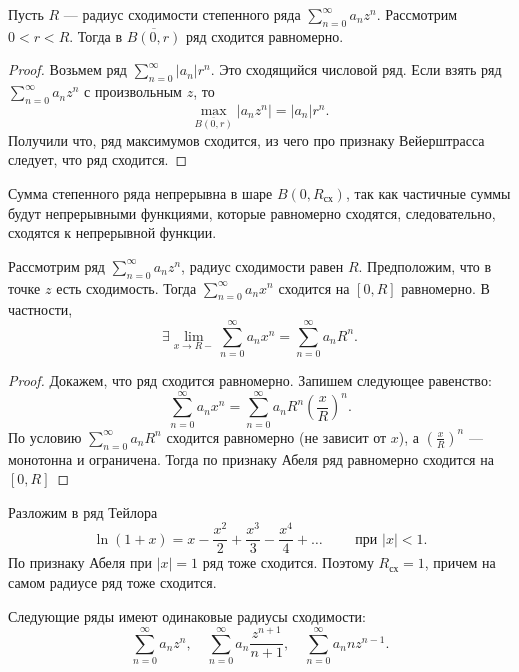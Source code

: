\begin{thm}
	Пусть $ R$ --- радиус сходимости степенного ряда  $ \sum_{n=0}^{\infty} a_n z^{n}$. Рассмотрим $ 0 < r < R$. Тогда в $ \overline{B(0, r)}$ ряд сходится равномерно.
\end{thm}
\begin{proof}
    Возьмем ряд $ \sum_{n=0}^{\infty} \lvert a_n \rvert r^{n}$. Это сходящийся числовой ряд. Если взять ряд $ \sum_{n=0}^{\infty} a_n z^{n}$ с произвольным $ z$, то 
	\[
		\max_{\overline{B(0, r)}} \lvert a_n z^{n} \rvert = \lvert a_n \rvert r^{n}
	.\] 
	Получили что, ряд максимумов сходится, из чего про признаку Вейерштрасса следует, что ряд сходится.
\end{proof}
\begin{cor}
	Сумма степенного ряда непрерывна в шаре $ B(0, R_{\text{сх}})$, так как частичные суммы будут непрерывными функциями, которые равномерно сходятся, следовательно, сходятся к непрерывной функции. 
\end{cor}
\begin{thm}
	Рассмотрим ряд $ \sum_{n=0}^{\infty} a_n z^{n}$,  радиус сходимости равен $ R$. Предположим, что в точке $ z$ есть сходимость. Тогда  $ \sum_{n=0}^{\infty} a_n x^{n}$ сходится на $ [0, R]$ равномерно.
	В частности,
	\[
	\exists \lim_{x \to  R-} \sum_{n=0}^{\infty} a_n x^{n} = \sum_{n=0}^{\infty} a_n R^{n}
	.\] 
\end{thm}
\begin{proof}
    Докажем, что ряд сходится равномерно. Запишем следующее равенство:
	\[
		\sum_{n=0}^{\infty} a_n x^{n} = \sum_{n=0}^{\infty} a_{n}R^{n} \left( \frac{x}{R} \right) ^{n}
	.\] 
	По условию $ \sum_{n=0}^{\infty} a_{n}R^{n}$ сходится равномерно (не зависит от $ x$), а $ \left( \frac{x}{R} \right) ^{n}$ --- монотонна и ограничена. Тогда по признаку Абеля ряд равномерно сходится на $ [0, R]$
\end{proof}
\begin{ex}
    Разложим в ряд Тейлора
	\[
		\ln (1 + x) = x - \frac{x^2}{2} + \frac{x^3}{3} - \frac{x^{4}}{4} + \ldots \qquad \text{ при } \lvert x \rvert < 1
	.\] 
	По признаку Абеля при $ \lvert x \rvert = 1$ ряд тоже сходится. Поэтому $ R_{\text{сх}} = 1$, причем на самом радиусе ряд тоже сходится.
\end{ex}
\begin{lm}
    Следующие ряды имеют одинаковые радиусы сходимости:
	\[
		\sum_{n=0}^{\infty} a_{n}z^{n}, \quad \sum_{n=0}^{\infty} a_n \frac{z^{n+1}}{n+1}, \quad \sum_{n=0}^{\infty} a_{n} n z^{n-1}
	.\] 
\end{lm}
